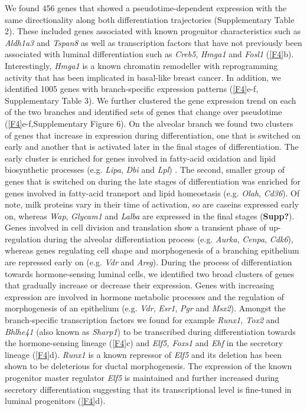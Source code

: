 \documentclass[titlepage, 12pt, oneside]{amsart}
\begin{document}
We found 456 genes that showed a pseudotime-dependent expression with the same directionality along both differentiation trajectories (Supplementary Table 2).
These included genes associated with known progenitor characteristics such as \textit{Aldh1a3} and \textit{Tspan8} as well as transcription factors that have not previously been associated with luminal differentiation such as \textit{Creb5}, \textit{Hmga1} and \textit{Fosl1} (\autoref{F4}b).
Interestingly, \textit{Hmga1} is a known chromatin remodeller with reprogramming activity that has been implicated in basal-like breast cancer\autocite{Shah2012,Shah2013}.
In addition, we identified 1005 genes with branch-specific expression patterns (\autoref{F4}e-f, Supplementary Table 3).
We further clustered the gene expression trend on each of the two branches and identified sets of genes that change over pseudotime (\autoref{F4}e-f,Supplementary Figure 6).
On the alveolar branch we found two clusters of genes that increase in expression during differentiation, one that is switched on early and another that is activated later in the final stages of differentiation.
The early cluster is enriched for genes involved in fatty-acid oxidation and lipid biosynthetic processes (e.g. \textit{Lipa}, \textit{Dbi} and \textit{Lpl}) .
The second, smaller group of genes that is switched on during the late stages of differentiation was enriched for genes involved in fatty-acid transport and lipid homeostasis (e.g. \textit{Olah}, \textit{Cd36}).
Of note, milk proteins vary in their time of activation, so are caseins expressed early on, whereas \textit{Wap}, \textit{Glycam1} and \textit{Lalba} are expressed in the final stages (\textbf{Supp?}).
Genes involved in cell division and translation show a transient phase of up-regulation during the alveolar differentiation process (e.g. \textit{Aurka}, \textit{Cenpa}, \textit{Cdk6}), whereas genes regulating cell shape and morphogenesis of a branching epithelium are repressed early on (e.g. \textit{Vdr} and \textit{Areg}).
During the process of differentiation towards hormone-sensing luminal cells, we identified two broad clusters of genes that gradually increase or decrease their expression.
Genes with increasing expression are involved in hormone metabolic processes and the regulation of morphogenesis of an epithelium (e.g. \textit{Vdr}, \textit{Esr1}, \textit{Pgr} and \textit{Msx2}).
Amongst the branch-specific transcription factors we found for example \textit{Runx1, Tox2} and \textit{Bhlhe41} (also known as \textit{Sharp1}) to be transcribed during differentiation towards the hormone-sensing lineage (\autoref{F4}c) and \textit{Elf5, Foxs1} and \textit{Ehf} in the secretory lineage (\autoref{F4}d).
\textit{Runx1} is a known repressor of \textit{Elf5} and its deletion has been shown to be deleterious for ductal morphogenesis\autocite{VanBragt2014}.
The expression of the known progenitor master regulator \textit{Elf5} is maintained and further increased during secretory differentiation suggesting that its transcriptional level is fine-tuned in luminal progenitors (\autoref{F4}d).
\end{document}
